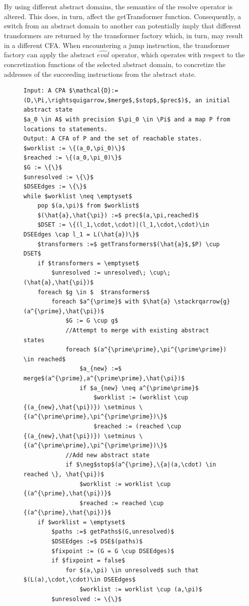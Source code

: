 \documentclass{kththesis}
\newcommand\stackrqarrow[1]{%
    \mathrel{\stackon[2pt]{$\rightsquigarrow$}{$\scriptscriptstyle#1$}}}
\begin{document}
\\ \\
By using different abstract domains, the semantics of the resolve operator is altered. This does, in turn, affect the getTransformer function. Consequently, a switch from an abstract domain to another can potentially imply that different transformers are returned by the transformer factory which, in turn, may result in a different CFA. When encountering a jump instruction, the transformer factory can apply the abstract $\widehat{eval}$ operator, which operates with respect to the concretization functions of the selected abstract domain, to concretize the addresses of the succeeding instructions from the abstract state.
\begin{figure}[htb]
    \centering
\begin{algorithmFrame}
\begin{lstlisting}[style=algorithm]
Input: A CPA $\mathcal{D}:=(D,\Pi,\rightsquigarrow,$merge$,$stop$,$prec$)$, an initial abstract state
$a_0 \in A$ with precision $\pi_0 \in \Pi$ and a map P from locations to statements.
Output: A CFA of P and the set of reachable states.
$worklist := \{(a_0,\pi_0)\}$
$reached := \{(a_0,\pi_0)\}$
$G := \{\}$
$unresolved := \{\}$
$DSEEdges := \{\}$
while $worklist \neq \emptyset$ 
    pop $(a,\pi)$ from $worklist$
    $(\hat{a},\hat{\pi}) :=$ prec$(a,\pi,reached)$
    $DSET := \{(l_1,\cdot,\cdot)|(l_1,\cdot,\cdot)\in DSEEdges \cap l_1 = L(\hat{a})\}$
    $transformers :=$ getTransformers$(\hat{a}$,$P) \cup DSET$
    if $transformers = \emptyset$
        $unresolved := unresolved\; \cup\; (\hat{a},\hat{\pi})$
    foreach $g \in $  $transformers$ 
        foreach $a^{\prime}$ with $\hat{a} \stackrqarrow{g} (a^{\prime},\hat{\pi})$
            $G := G \cup g$
            //Attempt to merge with existing abstract states
            foreach $(a^{\prime\prime},\pi^{\prime\prime}) \in reached$
                $a_{new} :=$ merge$(a^{\prime},a^{\prime\prime},\hat{\pi})$
                if $a_{new} \neq a^{\prime\prime}$
                    $worklist := (worklist \cup {(a_{new},\hat{\pi})}) \setminus \{(a^{\prime\prime},\pi^{\prime\prime})\}$
                    $reached := (reached \cup {(a_{new},\hat{\pi})}) \setminus \{(a^{\prime\prime},\pi^{\prime\prime})\}$
            //Add new abstract state
            if $\neg$stop$(a^{\prime},\{a|(a,\cdot) \in reached \}, \hat{\pi})$
                $worklist := worklist \cup {(a^{\prime},\hat{\pi})}$
                $reached := reached \cup {(a^{\prime},\hat{\pi})}$
    if $worklist = \emptyset$
        $paths :=$ getPaths$(G,unresolved)$
        $DSEEdges :=$ DSE$(paths)$
        $fixpoint := (G = G \cup DSEEdges)$
        if $fixpoint = false$
            for $(a,\pi) \in unresolved$ such that $(L(a),\cdot,\cdot)\in DSEEdges$
                $worklist := worklist \cup (a,\pi)$
        $unresolved := \{\}$
            

\end{lstlisting}
\end{algorithmFrame}
\end{figure}
\end{document}
